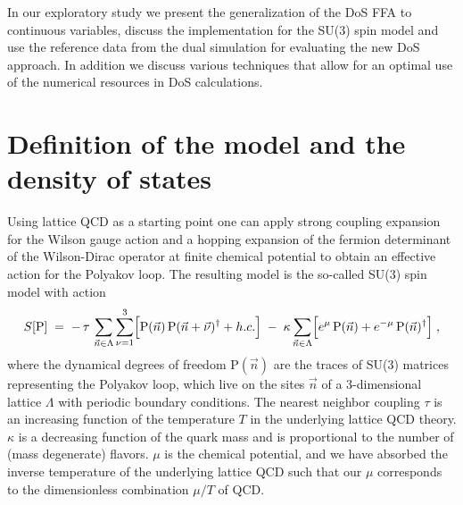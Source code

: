 \documentclass[a4paper,11pt]{article}
\begin{document}
In our exploratory study we present the generalization of the DoS FFA to continuous variables, discuss the
implementation for the SU(3) spin model and use the reference data from the dual simulation for evaluating the 
new DoS approach. In addition we discuss various techniques that allow for an optimal use of the numerical resources 
in DoS calculations.

\section{Definition of the model and the density of states}

Using lattice QCD as a starting point one can apply strong coupling expansion for the Wilson gauge action 
and a hopping expansion of the fermion determinant of the Wilson-Dirac operator at finite chemical potential to 
obtain an effective action for the Polyakov loop. The resulting model is the so-called SU(3) spin model with action
%
\begin{equation}
S[\mathrm{P}] \; = \; - \, \tau \, \sum\limits_{\vec{n} \in \Lambda} \sum\limits_{\nu=1}^3 
\Bigl[ \mathrm{P}(\vec{n}) \, \mathrm{P}(\vec{n}+\vec{\nu})^{\dagger} + h.c. \Bigr] \; - \;  
\kappa \sum\limits_{\vec{n} \in \Lambda } 
\Bigl[ e^\mu \, \mathrm{P}(\vec{n}) + e^{-\mu} \, \mathrm{P}(\vec{n})^{\dagger} \Bigr]  \; ,
\label{action}
\end{equation}
%
where the dynamical degrees of freedom $\mathrm{P}(\vec{n})$ are the traces of SU(3) matrices representing
the Polyakov loop, which live on the sites $\vec{n}$ of a 3-dimensional lattice $\Lambda$ with periodic 
boundary conditions. The nearest neighbor coupling $\tau$ is an increasing function of the temperature 
$T$ in the underlying lattice QCD theory. $\kappa$ is a decreasing function of the quark mass and is 
proportional to the number of (mass degenerate) flavors. $\mu$ is the chemical potential, and we have absorbed the 
inverse temperature of the underlying lattice QCD such that our $\mu$ corresponds to the dimensionless combination 
$\mu/T$ of QCD. 
\end{document}
